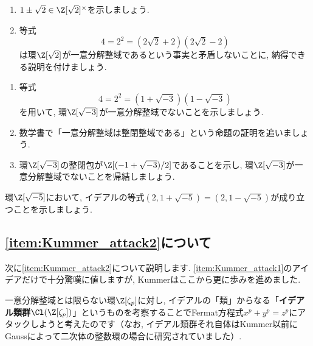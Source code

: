 \documentclass[11pt,b5paper,oneside,titlepage,lualatex]{ltjsreport}
\begin{document}
\begin{exc}{}{}
	\begin{enumerate}
		\item $ 1 \pm \sqrt{2} \in \Z[\sqrt{2}]^\times $を示しましょう. 
		\item 等式
		\[
		4 = 2^2 = (2\sqrt{2} + 2) (2\sqrt{2} - 2)
		\]
		は環$ \Z[\sqrt{2}] $が一意分解整域であるという事実と矛盾しないことに, 納得できる説明を付けましょう. 
	\end{enumerate}
\end{exc}

\begin{exc}{}{}
	\begin{enumerate}
		\item 等式
		\[
		4 = 2^2 = (1 + \sqrt{-3}) (1 - \sqrt{-3})
		\]
		を用いて, 環$ \Z[\sqrt{-3}] $が一意分解整域でないことを示しましょう. 
		\item 数学書で「一意分解整域は整閉整域である」という命題の証明を追いましょう. 
		\item 環$ \Z[\sqrt{-3}] $の整閉包が$ \Z[(-1 + \sqrt{-3})/2] $であることを示し, 環$ \Z[\sqrt{-3}] $が一意分解整域でないことを帰結しましょう. 
	\end{enumerate}
\end{exc}

\begin{exc}{}{}
	環$ \Z[\sqrt{-5}] $において, イデアルの等式$ (2, 1 + \sqrt{-5}) = (2, 1 - \sqrt{-5}) $が成り立つことを示しましょう. 
\end{exc}



\subsection{\ref{item:Kummer_attack2}について}


次に\ref{item:Kummer_attack2}について説明します. 
\ref{item:Kummer_attack1}のアイデアだけで十分驚嘆に値しますが, Kummerはここから更に歩みを進めました. 

一意分解整域とは限らない環$ \Z[\zeta_p] $に対し, イデアルの「類」からなる「\textbf{イデアル類群}$ \Cl(\Z[\zeta_p]) $」というものを考察することでFermat方程式$ x^p + y^p = z^p $にアタックしようと考えたのです（なお, イデアル類群それ自体はKummer以前にGaussによって二次体の整数環の場合に研究されていました）. 
\end{document}
